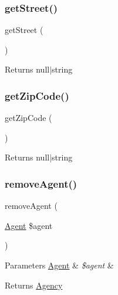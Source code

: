 \subsubsection{\texorpdfstring{getStreet()}{getStreet()}}
{\footnotesize\ttfamily get\+Street (\begin{DoxyParamCaption}{ }\end{DoxyParamCaption})}

\begin{DoxyReturn}{Returns}
null$\vert$string 
\end{DoxyReturn}
\mbox{\label{class_app_1_1_entity_1_1_agency_a57a82c7e2cc6a5009844b8a9a9995e93}} 
\subsubsection{\texorpdfstring{getZipCode()}{getZipCode()}}
{\footnotesize\ttfamily get\+Zip\+Code (\begin{DoxyParamCaption}{ }\end{DoxyParamCaption})}

\begin{DoxyReturn}{Returns}
null$\vert$string 
\end{DoxyReturn}
\mbox{\label{class_app_1_1_entity_1_1_agency_a01fc29de78c9b260ee2b5615070e1b0e}} 
\subsubsection{\texorpdfstring{removeAgent()}{removeAgent()}}
{\footnotesize\ttfamily remove\+Agent (\begin{DoxyParamCaption}\item[{\mbox{\hyperlink{class_app_1_1_entity_1_1_agent}{Agent}}}]{\$agent }\end{DoxyParamCaption})}


\begin{DoxyParams}[1]{Parameters}
\mbox{\hyperlink{class_app_1_1_entity_1_1_agent}{Agent}} & {\em \$agent} & \\
\hline
\end{DoxyParams}
\begin{DoxyReturn}{Returns}
\mbox{\hyperlink{class_app_1_1_entity_1_1_agency}{Agency}} 
\end{DoxyReturn}
\mbox{\label{class_app_1_1_entity_1_1_agency_a955a2815b38e0559cf3ecf3d21233c67}} 
